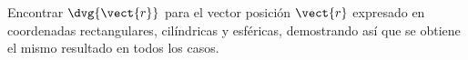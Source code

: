 \documentclass[./../main.tex]{subfiles}
\begin{document}
    \section{}
    Encontrar \(\dvg{\vect{r}}\) para el vector posición \(\vect{r}\) expresado en coordenadas rectangulares, cilíndricas y esféricas, demostrando así que se obtiene el mismo resultado en todos los casos.
\end{document}
